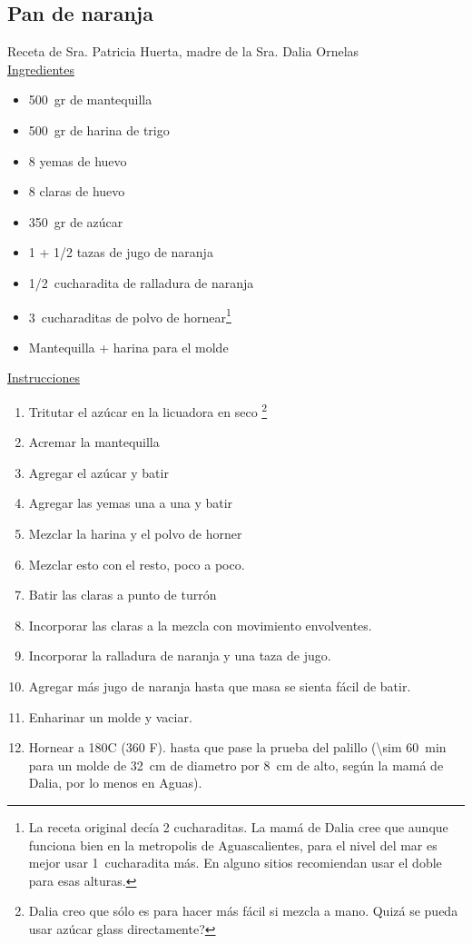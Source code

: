 \subsection{Pan de naranja}

Receta de Sra. Patricia Huerta, madre de la Sra. Dalia Ornelas\\

\underline{Ingredientes} 
\begin{itemize}
\item \SI{500}{gr} de mantequilla
\item \SI{500}{gr} de harina de trigo
\item 8 yemas  de huevo
\item 8 claras de huevo
\item \SI{350}{gr} de azúcar
\item 1 + \num{1/2} tazas de jugo de naranja
\item \SI{1/2}{cucharadita} de ralladura de naranja
\item \SI{3}{cucharaditas} de polvo de hornear\footnote{La receta original decía 2 cucharaditas. La mamá de Dalia cree que aunque funciona bien en la metropolis de Aguascalientes, para el nivel del mar es mejor usar \SI{1}{cucharadita} más. En alguno sitios recomiendan usar el doble para esas alturas.}
\item Mantequilla +  harina para el molde
\end{itemize}

\underline{Instrucciones}
\begin{enumerate}
\item Tritutar el azúcar en la licuadora en seco \footnote{Dalia creo que sólo es para hacer más fácil si mezcla a mano. Quizá se pueda usar azúcar glass directamente?}
\item Acremar la mantequilla
\item Agregar el azúcar y batir
\item Agregar las yemas una a una y batir
\item Mezclar la harina y el polvo de horner
\item Mezclar esto con el resto, poco a poco.
\item Batir las claras a punto de turrón
\item Incorporar las claras a la mezcla con movimiento envolventes.
\item Incorporar la ralladura de naranja y una taza de jugo.
\item Agregar más jugo de naranja hasta que masa se sienta fácil de batir.
\item Enharinar un molde y vaciar.
\item Hornear a 180C (360 F). hasta que pase la prueba del palillo (\SI{\sim 60}{min} para un molde de \SI{32}{cm} de diametro por \SI{8}{cm} de alto, según la mamá de Dalia, por lo menos en Aguas).
\end{enumerate}